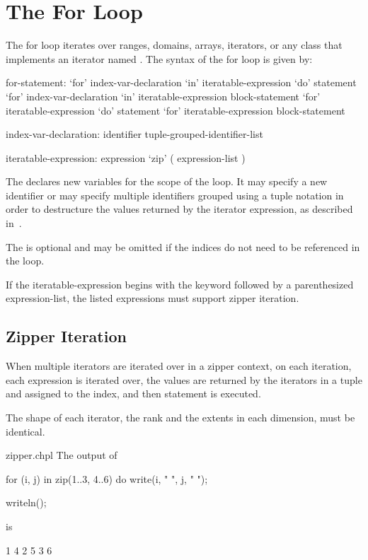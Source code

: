 \section{The For Loop}
\label{The_For_Loop}

The for loop iterates over ranges, domains, arrays, iterators, or any
class that implements an iterator named .  The syntax of
the for loop is given by:
\begin{syntax}
for-statement:
  `for' index-var-declaration `in' iteratable-expression `do' statement
  `for' index-var-declaration `in' iteratable-expression block-statement
  `for' iteratable-expression `do' statement
  `for' iteratable-expression block-statement

index-var-declaration:
  identifier
  tuple-grouped-identifier-list

iteratable-expression:
  expression
  `zip' ( expression-list )
\end{syntax}

The  declares new variables for the scope
of the loop.  It may specify a new identifier or may specify multiple
identifiers grouped using a tuple notation in order to destructure the
values returned by the iterator expression, as described
in~.

The  is optional and may be omitted if the
indices do not need to be referenced in the loop.

If the iteratable-expression begins with the keyword  followed
by a parenthesized expression-list, the listed expressions must support
zipper iteration.

\subsection{Zipper Iteration}
\label{Zipper_Iteration}

When multiple iterators are iterated over in a zipper context, on each
iteration, each expression is iterated over, the values are returned
by the iterators in a tuple and assigned to the index, and then
statement is executed.

The shape of each iterator, the rank and the extents in each
dimension, must be identical.

\begin{chapelexample}{zipper.chpl}
The output of
\begin{chapel}
for (i, j) in zip(1..3, 4..6) do
  write(i, " ", j, " ");
\end{chapel}
\begin{chapelpost}
writeln();
\end{chapelpost}
is
\begin{chapelprintoutput}{}
1 4 2 5 3 6 
\end{chapelprintoutput}
\end{chapelexample}

